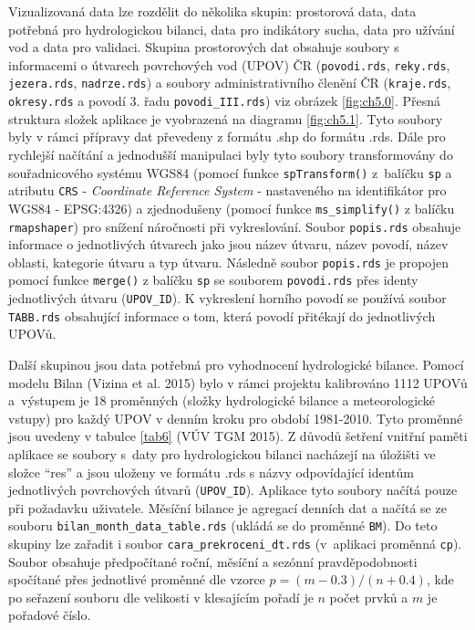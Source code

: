 \documentclass[12pt,]{article}
\begin{document}
\qquad Vizualizovaná data lze rozdělit do několika skupin: prostorová
data, data potřebná pro hydrologickou bilanci, data pro indikátory
sucha, data pro užívání vod a data pro validaci. Skupina prostorových
dat obsahuje soubory s informacemi o útvarech povrchových vod (UPOV) ČR
(\texttt{povodi.rds}, \texttt{reky.rds}, \texttt{jezera.rds},
\texttt{nadrze.rds}) a soubory administrativního členění ČR
(\texttt{kraje.rds}, \texttt{okresy.rds} a povodí 3. řadu
\texttt{povodi\_III.rds}) viz obrázek \ref{fig:ch5.0}. Přesná struktura
složek aplikace je vyobrazená na diagramu \ref{fig:ch5.1}. Tyto soubory
byly v rámci přípravy dat převedeny z formátu .shp do formátu .rds. Dále
pro rychlejší načítání a jednodušší manipulaci byly tyto soubory
transformovány do souřadnicového systému WGS84 (pomocí funkce
\texttt{spTransform()} z~balíčku \texttt{sp} a atributu \texttt{CRS} -
\emph{Coordinate Reference System} - nastaveného na identifikátor pro
WGS84 - EPSG:4326) a zjednodušeny (pomocí funkce \texttt{ms\_simplify()}
z balíčku \texttt{rmapshaper}) pro snížení náročnosti při vykreslování.
Soubor \texttt{popis.rds} obsahuje informace o jednotlivých útvarech
jako jsou název útvaru, název povodí, název oblasti, kategorie útvaru a
typ útvaru. Následně soubor \texttt{popis.rds} je propojen pomocí funkce
\texttt{merge()} z balíčku \texttt{sp} se souborem \texttt{povodi.rds}
přes identy jednotlivých útvaru (\texttt{UPOV\_ID}). K vykreslení
horního povodí se používá soubor \texttt{TABB.rds} obsahující informace
o tom, která povodí přitékají do jednotlivých UPOVů.

\qquad Další skupinou jsou data potřebná pro vyhodnocení hydrologické
bilance. Pomocí modelu Bilan (Vizina et al. 2015) bylo v rámci projektu
kalibrováno 1112 UPOVů a~výstupem je 18 proměnných (složky hydrologické
bilance a meteorologické vstupy) pro každý UPOV v denním kroku pro
období \mbox{1981-2010}. Tyto proměnné jsou uvedeny v tabulce \ref{tab6}
(VÚV TGM 2015). Z důvodů šetření vnitřní paměti aplikace se soubory
s~daty pro hydrologickou bilanci nacházejí na úložišti ve složce
\enquote{res} a jsou uloženy ve formátu .rds s názvy odpovídající
identům jednotlivých povrchových útvarů (\texttt{UPOV\_ID}). Aplikace
tyto soubory načítá pouze při požadavku uživatele. Měsíční bilance je
agregací denních dat a načítá se ze souboru
\texttt{bilan\_month\_data\_table.rds} (ukládá se do proměnné
\texttt{BM}). Do teto skupiny lze zařadit i soubor
\texttt{cara\_prekroceni\_dt.rds} (v~aplikaci proměnná \texttt{cp}).
Soubor obsahuje předpočítané roční, měsíční a sezónní pravděpodobnosti
spočítané přes jednotlivé proměnné dle vzorce
\mbox{$p = (m-0.3)/(n+0.4)$}, kde po seřazení souboru dle velikosti v
klesajícím pořadí je \(n\) počet prvků a \(m\) je pořadové číslo.
\end{document}
